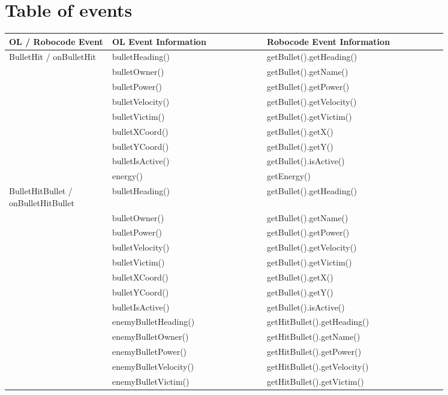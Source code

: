 \section{Table of events}
\begin{center}
	\begin{tabular}{ | p{0.2\linewidth} | p{0.3\linewidth} | p{0.35\linewidth} |}
		\hline
		OL / Robocode Event& OL Event Information & Robocode Event Information \\ \hline
		BulletHit / onBulletHit& bulletHeading() & getBullet().getHeading() \\ \hline
		& bulletOwner() & getBullet().getName() \\ \hline
		& bulletPower() & getBullet().getPower() \\ \hline
		& bulletVelocity() & getBullet().getVelocity() \\ \hline
		& bulletVictim() & getBullet().getVictim() \\ \hline
		& bulletXCoord() & getBullet().getX() \\ \hline
		& bulletYCoord() & getBullet().getY() \\ \hline
		& bulletIsActive() & getBullet().isActive() \\ \hline
		& energy() & getEnergy() \\ \hline
		BulletHitBullet / onBulletHitBullet& bulletHeading() & getBullet().getHeading() \\ \hline
		& bulletOwner() & getBullet().getName() \\ \hline
		& bulletPower() & getBullet().getPower() \\ \hline
		& bulletVelocity() & getBullet().getVelocity() \\ \hline
		& bulletVictim() & getBullet().getVictim() \\ \hline
		& bulletXCoord() & getBullet().getX() \\ \hline
		& bulletYCoord() & getBullet().getY() \\ \hline
		& bulletIsActive() & getBullet().isActive() \\ \hline
		& enemyBulletHeading() & getHitBullet().getHeading() \\ \hline
		& enemyBulletOwner() & getHitBullet().getName() \\ \hline
		& enemyBulletPower() & getHitBullet().getPower() \\ \hline
		& enemyBulletVelocity() & getHitBullet().getVelocity() \\ \hline
		& enemyBulletVictim() & getHitBullet().getVictim() \\ \hline

\end{tabular}
\end{center}
